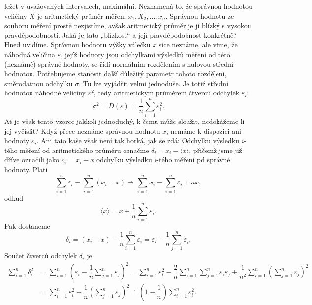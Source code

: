       ležet v uvažovaných intervalech, maximální. Neznamená to, že správnou hodnotou veličiny \(X\) 
      je aritmetický průměr měření \(x_1, X_2, \ldots, x_n\). Správnou hodnotu ze souboru měření 
      prostě nezjistíme, avšak aritmetický průměr je jí blízký s vysokou pravděpodobností. Jaká je 
      tato „blízkost“ a její pravděpodobnost konkrétně? Hned uvidíme. Správnou hodnotu výšky 
      válečku \(x\) sice neznáme, ale víme, že náhodná veličina \(\varepsilon\), jejíž hodnoty jsou 
      odchylkami výsledků měření od této (neznámé) správné hodnoty, se řídí normálním rozdělením s 
      nulovou střední hodnotou. Potřebujeme stanovit další důležitý parametr tohoto rozdělení, 
      směrodatnou odchylku \(\sigma\). Tu lze vyjádřit velmi jednoduše. Je totiž střední hodnotou 
      náhodné veličiny \(\varepsilon^2\), tedy aritmetickým průměrem čtverců odchylek 
      \(\varepsilon_i\): 
      \begin{equation*}
        \sigma^2 = D(\varepsilon) = \dfrac{1}{n}\sum_{i=1}^{n}\varepsilon_i^2.
      \end{equation*}
      Ať je však tento vzorec jakkoli jednoduchý, k čemu může sloužit, nedokážeme-li jej vyčíslit?
      Když přece neznáme správnou hodnotu \(x\), nemáme k dispozici ani hodnoty \(\varepsilon_i\). 
      Ani tato kaše však není tak horká, jak se zdá: Odchylku výsledku \(i\)-tého měření od 
      aritmetického průměru označme \(\delta_i = x_i - \langle x \rangle\), přičemž jsme již dříve 
      označili jako \(\varepsilon_i= x_i - x\) odchylku výsledku \(i\)-tého měření pd správné 
      hodnoty. Platí
      \begin{equation*}
        \sum_{i=1}^{n}\varepsilon_i = \sum_{i=1}^{n}(x_i - x) \Rightarrow 
        \sum_{i=1}^{n}x_i = \sum_{i=1}^{n}\varepsilon_i + nx, 
      \end{equation*}
      odkud 
      \begin{equation*}
        \langle x \rangle = x + \dfrac{1}{n}\sum_{i=1}^{n}\varepsilon_i.
      \end{equation*}
      Pak dostaneme
      \begin{equation*}
        \delta_i = (x_i - x) - \dfrac{1}{n}\sum_{i=1}^{n}\varepsilon_i 
                 = \varepsilon_i - \dfrac{1}{n}\sum_{j=1}^{n}\varepsilon_j.
      \end{equation*}
      Součet čtverců odchylek \(\delta_i\) je
      \begin{align*}
        \sum_{i=1}^{n}\delta_i^2 
          &= \sum_{i=1}^{n}\left(\varepsilon_i - 
             \dfrac{1}{n}\sum_{j=1}^{n}\varepsilon_j\right)^2 = \sum_{i=1}^{n}\varepsilon_i^2 - 
             \dfrac{2}{n}\sum_{i=1}^{n}\sum_{j=1}^{n}\varepsilon_i\varepsilon_j + 
             \dfrac{1}{n^2}\sum_{i=1}^{n}\left(\sum_{j=1}^{n}\varepsilon_j\right)^2     \\
          &= \sum_{i=1}^{n}\varepsilon_i^2 - 
             \dfrac{1}{n}\left(\sum_{j=1}^{n}\varepsilon_j\right)^2                     
             \doteq \left(1 - \dfrac{1}{n}\right)\sum_{i=1}^{n}\varepsilon_i^2.
      \end{align*}
